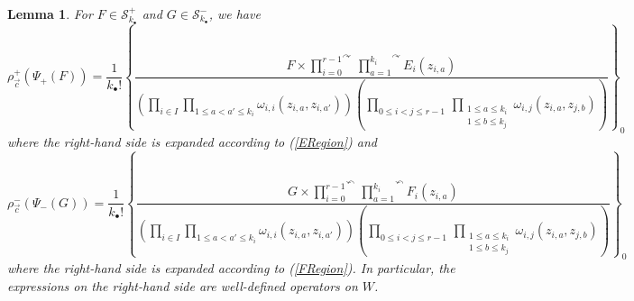 \documentclass{amsart}
\newtheorem{lem}[thm]{Lemma}
\theoremstyle{remark}
\numberwithin{thm}{section}
\numberwithin{equation}{section}
\begin{document}
\begin{lem}\label{ConstTermLem}
For $F\in\mathcal{S}^+_{k_\bullet}$ and $G\in\mathcal{S}^-_{k_\bullet}$, we have
\begin{equation}
\rho^+_{\vec{c}}(\Psi_+(F))
=\frac{1}{k_\bullet!}\left\{\frac{\displaystyle F\times\overset{\curvearrowright}{\prod_{i=0}^{r-1}}\,\overset{\curvearrowright}{\prod_{a=1}^{k_i}}E_i(z_{i,a})}
{\displaystyle\left(\prod_{i\in I}\prod_{1\le a<a'\le k_i}\omega_{i,i}(z_{i,a},z_{i,a'})\right)
\left(\prod_{0\le i< j\le r-1}\,\prod_{\substack{1\le a\le k_i\\1\le b\le k_j}}\omega_{i,j}(z_{i,a},z_{j,b})\right)}\right\}_0
\label{ConstantTermE}
\end{equation}
where the right-hand side is expanded according to (\ref{ERegion}) and
\begin{equation}
\rho^-_{\vec{c}}(\Psi_-(G))
= \frac{1}{k_\bullet!}\left\{\frac{\displaystyle G\times\overset{\curvearrowleft}{\prod_{i=0}^{r-1}}\,\overset{\curvearrowleft}{\prod_{a=1}^{k_i}}F_i(z_{i,a})}
{\displaystyle\left(\prod_{i\in I}\prod_{1\le a<a'\le k_i}\omega_{i,i}(z_{i,a},z_{i,a'})\right)
\left(\prod_{0\le i< j\le r-1}\,\prod_{\substack{1\le a\le k_i\\1\le b\le k_j}}\omega_{i,j}(z_{i,a},z_{j,b})\right)}\right\}_0
\label{ConstantTermF}
\end{equation}
where the right-hand side is expanded according to (\ref{FRegion}).
In particular, the expressions on the right-hand side are well-defined operators on $W$.
\end{lem}
\end{document}

